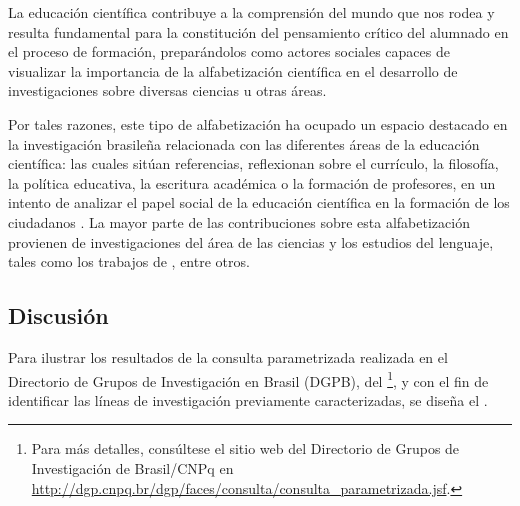 \documentclass[spanish]{textolivre}
\begin{document}
La educación científica contribuye a la comprensión del mundo que nos rodea y resulta fundamental para la constitución del pensamiento crítico del alumnado en el proceso de formación, preparándolos como actores sociales capaces de visualizar la importancia de la alfabetización científica en el desarrollo de investigaciones sobre diversas ciencias u otras áreas.   

Por tales razones, este tipo de alfabetización ha ocupado un espacio destacado en la investigación brasileña relacionada con las diferentes áreas de la educación científica: las cuales sitúan referencias, reflexionan sobre el currículo, la filosofía, la política educativa, la escritura académica o la formación de profesores, en un intento de analizar el papel social de la educación científica en la formación de los ciudadanos \cite{santos_educacao_2007}. La mayor parte de las contribuciones sobre esta alfabetización provienen de investigaciones del área de las ciencias y los estudios del lenguaje, tales como los trabajos de \textcite{santos_educacao_2007, motta-roth_letramento_2011, cunha_alfabetizacao_2017, silva_ciencia_2018}, entre otros.

\subsection{Discusión}\label{sec-discusion}
Para ilustrar los resultados de la consulta parametrizada realizada en el Directorio de Grupos de Investigación en Brasil (DGPB), del \textcite{consejo_nacional_de_desarrollo_cientifico_y_tecnologico__cnpq_directorio_nodate}\footnote{Para más detalles, consúltese el sitio web del Directorio de Grupos de Investigación de Brasil/CNPq en \url{http://dgp.cnpq.br/dgp/faces/consulta/consulta_parametrizada.jsf}.}, y con el fin de identificar las líneas de investigación previamente caracterizadas, se diseña el .
\end{document}
